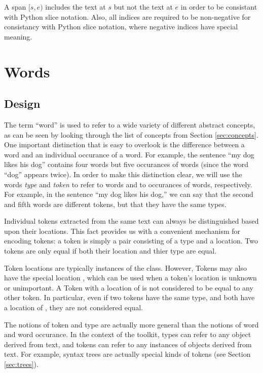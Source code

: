 \documentclass[11pt]{article}
\begin{document}
  A span $[s,e)$ includes the text at $s$ but not the text at $e$ in
  order to be consistant with Python slice notation.  Also, all
  indices are required to be non-negative for consistancy with Python
  slice notation, where negative indices have special meaning.

\section{Words}
\label{sec:words}

  \subsection{Design}

  The term ``word'' is used to refer to a wide variety of different
  abstract concepts, as can be seen by looking through the list of
  concepts from Section \ref{sec:concepts}.  One important distinction
  that is easy to overlook is the difference between a word and an
  individual occurance of a word.  For example, the sentence ``my dog
  likes his dog'' contains four words but five occurances of words
  (since the word ``dog'' appears twice).  In order to make this
  distinction clear, we will use the words \emph{type} and
  \emph{token} to refer to words and to occurances of words,
  respectively.  For example, in the sentence ``my dog likes his
  dog,'' we can say that the second and fifth words are different
  tokens, but that they have the same types.

  Individual tokens extracted from the same text can always be
  distinguished based upon their locations.  This fact provides us
  with a convenient mechanism for encoding tokens: a token is simply a
  pair consisting of a type and a location.  Two tokens are only equal
  if both their location and thier type are equal.

  Token locations are typically instances of the 
  class.  However, Tokens may also have the special location
  , which can be used when a token's location is unknown or
  unimportant.  A Token with a location of  is not
  considered to be equal to any other token.  In particular, even if
  two tokens have the same type, and both have a location of
  , they are not considered equal.

  The notions of token and type are actually more general than the
  notions of word and word occurance.  In the context of the toolkit,
  types can refer to any object derived from text, and tokens can
  refer to any instances of objects derived from text.  For example,
  syntax trees are actually special kinds of tokens (see Section
  \ref{sec:trees}).
\end{document}
